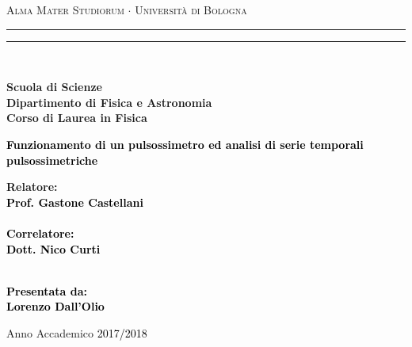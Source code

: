 \documentclass[a4paper, 12pt]{book}
\begin{document}


\begin{titlepage}
%
%
%
%
%
\begin{center}
{{\Large{\textsc{Alma Mater Studiorum $\cdot$ Universit\`a di Bologna}}}}
\rule[0.1cm]{15.8cm}{0.1mm}
\rule[0.5cm]{15.8cm}{0.6mm}
\\\vspace{3mm}

{\small{\bf Scuola di Scienze \\
Dipartimento di Fisica e Astronomia\\
Corso di Laurea in Fisica}}

\end{center}

\vspace{23mm}

\begin{center}\textcolor{black}{
%
%
{\LARGE{\bf Funzionamento di un pulsossimetro ed analisi di serie temporali pulsossimetriche}}\\
}\end{center}

\vspace{50mm} \par \noindent

\begin{minipage}[t]{0.47\textwidth}
%
%
{\large{\bf Relatore: \vspace{2mm}\\\textcolor{black}{
Prof. Gastone Castellani}\\\\
%
%
%
%
\textcolor{black}{
\bf Correlatore:
\vspace{2mm}\\
Dott. Nico Curti\\\\}}}
\end{minipage}
%
\hfill
%
\begin{minipage}[t]{0.47\textwidth}\raggedleft \textcolor{black}{
{\large{\bf Presentata da:
\vspace{2mm}\\
%
%
Lorenzo Dall'Olio}}}
\end{minipage}

\vspace{40mm}

\begin{center}
%
%
Anno Accademico \textcolor{black}{ 2017/2018}
\end{center}

\end{titlepage}
\end{document}
